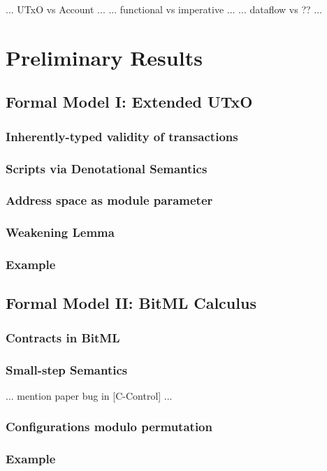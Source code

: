 \documentclass[acmsmall,nonacm=true,screen=true]{acmart}\settopmatter{printfolios=false,printccs=false,printacmref=false}
\begin{document}
... UTxO vs Account ...
... functional vs imperative ...
... dataflow vs ?? ...

\section{Preliminary Results}
\label{sec:results}

\subsection{Formal Model I: Extended UTxO}
\subsubsection{Inherently-typed validity of transactions}
\subsubsection{Scripts via Denotational Semantics}
\subsubsection{Address space as module parameter}
\subsubsection{Weakening Lemma}
\subsubsection{Example}

\subsection{Formal Model II: BitML Calculus}
\subsubsection{Contracts in BitML}
\subsubsection{Small-step Semantics}
... mention paper bug in [C-Control] ...
\subsubsection{Configurations modulo permutation}
\subsubsection{Example}
\end{document}
